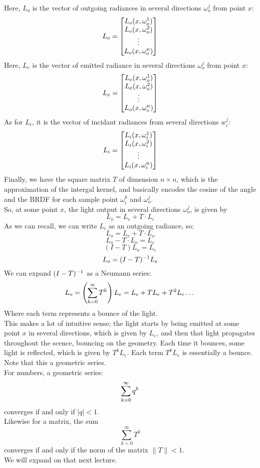 \documentclass[12pt]{article}
\begin{document}
Here, $L_o$ is the vector of outgoing radiances 
in several directions $\omega_o^j$ from point $x$:
\[ L_o = \begin{bmatrix} L_o(x, \omega_o^1) \\ L_o(x, \omega_o^2) \\
\vdots \\ L_o(x, \omega_o^n) \end{bmatrix} \]
Here, $L_e$ is the vector of emitted radiance 
in several directions $\omega_o^j$ from point $x$:
\[ L_e = \begin{bmatrix} L_e(x, \omega_o^1) \\ L_e(x, \omega_o^2) \\
\vdots \\ L_o(x, \omega_o^n) \end{bmatrix} \]
As for $L_i$, it is the vector of incidant radiances
from several directions $w_i^j$:
\[ L_i = \begin{bmatrix} L_i(x, \omega_i^1) \\ L_i(x, \omega_i^2) \\
\vdots \\ L_i(x, \omega_i^n) \end{bmatrix} \]
Finally, we have the square matrix $T$ 
of dimension $n \times n$, which is the approximation
of the intergal kernel,
and basically encodes the cosine of the angle
and the BRDF for each sample point $\omega_i^k$
and $\omega_o^j$. \\

So, at some point $x$, the light output
in several directions $\omega_o^j$,
is given by 
\[ L_o = L_e + T \cdot L_i \]
As we can recall, we can write $L_i$
as an outgoing radiance, so:
\[ L_o = L_e + T \cdot L_o \]
\[ L_o - T \cdot L_o = L_e \]
\[ (I - T)L_o = L_e \]
\[ L_o = (I - T)^{-1} L_e \]
We can expand $(I - T)^{-1}$ as a Neumann series:
\[ L_o = \left( \sum_{k = 0}^{\infty} T^k \right) L_e
= L_e + TL_e + T^2L_e \dots \]
Where each term represents a bounce of the light. \\

This makes a lot of intuitive sense;
the light starts by being emitted at some point
$x$ in several directions, which is given by $L_e$,
and then that light propagates throughout the scence,
bouncing on the geometry. Each time it bounces,
some light is reflected, which is given by $T^k L_e$.
Each term $T^k L_e$ is essentially a bounce. \\
Note that this a geometric series. \\

For numbers, a geometric series:
\[ \sum_{k = 0}^{\infty} q^k \]
converges if and only if $|q| < 1$. \\

Likewise for a matrix, the sum
\[ \sum_{k = 0}^{\infty} T^k \]
converges if and only if the norm of the matrix
$\|T\| < 1$. \\
We will expand on that next lecture. \\
\end{document}
